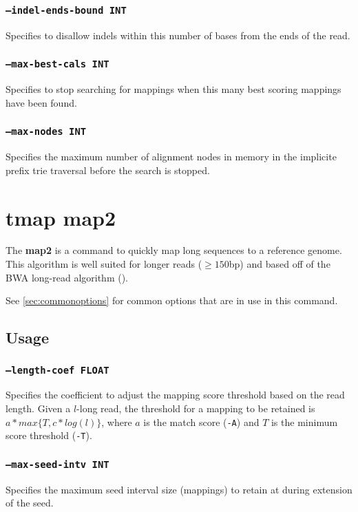 \documentclass[a4paper,12pt]{book}
\newcommand{\TT}[1]{{\tt #1}} %
\newcommand{\BF}[1]{{\bf #1}} %
\begin{document}
\subsubsection{\TT{--indel-ends-bound INT}}
Specifies to disallow indels within this number of bases from the ends of the read.

\subsubsection{\TT{--max-best-cals INT}}
Specifies to stop searching for mappings when this many best scoring mappings have been found.

\subsubsection{\TT{--max-nodes INT}}
Specifies the maximum number of alignment nodes in memory in the implicite prefix trie traversal before the search is stopped.

\section{tmap map2}
\label{sec:map2}
The \BF{map2} is a command to quickly map long sequences to a reference genome.
This algorithm is well suited for longer reads ($\geq 150$bp) and based off of the BWA long-read algorithm (\cite{BWA-long}).

See \autoref{sec:commonoptions} for common options that are in use in this command.

\subsection{Usage}

\subsubsection{\TT{--length-coef FLOAT}}
Specifies the coefficient to adjust the mapping score threshold based on the read length.
Given a $l$-long read, the threshold for a mapping to be retained is $a*max\{T,c*log(l)\}$, where $a$ is the match score (\TT{-A}) and $T$ is the minimum score threshold (\TT{-T}).

\subsubsection{\TT{--max-seed-intv INT}}
Specifies the maximum seed interval size (mappings) to retain at during extension of the seed.
\end{document}

